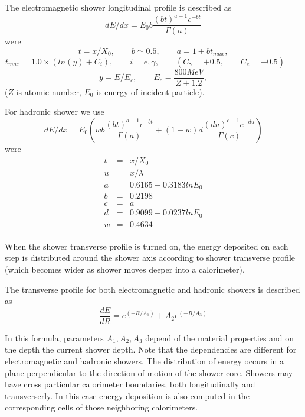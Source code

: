 The electromagnetic shower longitudinal profile is described as
\begin{displaymath}
 dE / dx = E_0 b \frac{ (bt)^{a-1} e^{-bt} } { \Gamma (a) }
\end{displaymath} 
were 
\begin{displaymath}
 t = x / X_0, \qquad
 b \simeq 0.5, \qquad
 a = 1 + b t_{max},
\end{displaymath} 
\begin{displaymath}
 t_{max} = 1.0 \times (ln(y) + C_i), \qquad
 i = e,\gamma, \qquad
 (C_{\gamma} = +0.5, \qquad
 C_{e} = -0.5)  \qquad
\end{displaymath} 
\begin{displaymath}
 y = E / E_c, \qquad
 E_c = \frac{800 MeV}{Z+1.2},
\end{displaymath} 
($Z$ is atomic number, $E_0$ is energy of incident particle).

For hadronic shower we use
\begin{displaymath}
 dE / dx = E_0 (w b \frac{ (bt)^{a-1} e^{-bt} } { \Gamma (a) } 
+ (1-w) d \frac{ (du)^{c-1} e^{-du}  } { \Gamma(c) })
\end{displaymath} 
were 
\begin{eqnarray}
 t &  = & x / X_0 \nonumber \\
 u & = & x / \lambda \nonumber \\
 a & = & 0.6165 + 0.3183 ln{E_0} \nonumber \\
 b & = & 0.2198 \nonumber \\
 c & = & a \nonumber \\
 d & = & 0.9099 - 0.0237 ln{E_0}\nonumber\\
 w & = & 0.4634\nonumber  \\
\end{eqnarray} 

When the shower transverse profile is turned on,
 the energy deposited on each step is distributed around the shower axis
according to shower transverse profile (which becomes wider as shower moves 
deeper into a calorimeter). 

The transverse profile for both electromagnetic and hadronic showers is 
described as
\begin{displaymath}
 \frac{dE}{dR} = e^{(-R / A_1)} + A_2 e^{(-R / A_3)}
\end{displaymath}

In this formula, parameters $A_1, A_2, A_3$ depend of the material  properties
and on the depth the current shower depth.  Note that the dependencies are
different for electromagnetic and hadronic showers. The distribution of energy
occurs in a plane perpendicular to the direction  of motion of the shower core.
Showers may have cross particular calorimeter boundaries, both longitudinally
and transverserly.  In this case energy  deposition is also
computed in the corresponding cells of those neighboring calorimeters.  

